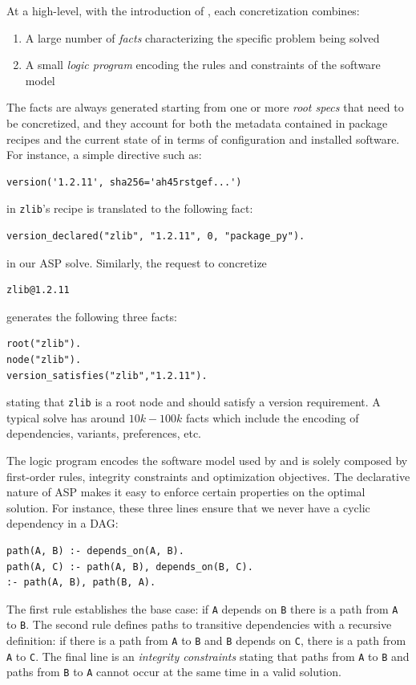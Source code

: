 At a high-level, with the introduction of \clingo, each concretization
combines:
\begin{enumerate}
\item A large number of \emph{facts} characterizing the specific problem being solved
\item A small \emph{logic program} encoding the rules and constraints of the software model
\end{enumerate}
The facts are always generated starting from one or more 
\emph{root specs} that need to be concretized, and they account 
for both the metadata contained in package recipes and the 
current state of \spack{} in terms of configuration and 
installed software.
For instance, a simple directive such as:
\begin{verbatim}
version('1.2.11', sha256='ah45rstgef...')
\end{verbatim}
in \texttt{zlib}'s recipe is translated to the following fact:
\begin{verbatim}
version_declared("zlib", "1.2.11", 0, "package_py").
\end{verbatim}
in our ASP solve. Similarly, the request to concretize
\begin{verbatim}
zlib@1.2.11
\end{verbatim}
generates the following three facts:
\begin{verbatim}
root("zlib").
node("zlib").
version_satisfies("zlib","1.2.11").
\end{verbatim}
stating that \texttt{zlib} is a root node and should satisfy
a version requirement.
A typical solve has around $10k-100k$ facts which include
the encoding of dependencies, variants, preferences, etc.

The logic program encodes the software model used by \spack{}
and is solely composed by first-order rules, integrity 
constraints and optimization objectives. 
The declarative nature of ASP makes it easy to enforce 
certain properties on the optimal solution. For instance, 
these three lines ensure that we never have a cyclic dependency
in a DAG:
\begin{verbatim}
path(A, B) :- depends_on(A, B).
path(A, C) :- path(A, B), depends_on(B, C).
:- path(A, B), path(B, A).
\end{verbatim}
The first rule establishes the base case: if \texttt{A} depends
on \texttt{B} there is a path from \texttt{A} to \texttt{B}.
The second rule defines paths to transitive dependencies 
with a recursive definition: if there is a path from \texttt{A} 
to \texttt{B} and \texttt{B} depends on \texttt{C}, there is
a path from \texttt{A} to \texttt{C}. The final line is an 
\emph{integrity constraints} stating that paths from \texttt{A} 
to \texttt{B} and paths from \texttt{B} to \texttt{A} cannot 
occur at the same time in a valid solution.

